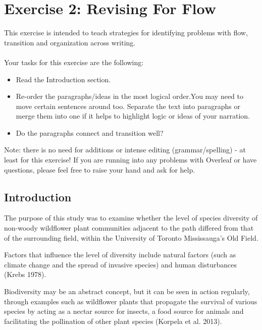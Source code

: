 \documentclass[11pt,a4paper]{article}
\begin{document}

\section{Exercise 2: Revising For Flow}

This exercise is intended to teach strategies for identifying problems with flow, transition and organization across writing.

\paragraph{} Your tasks for this exercise are the following:
\begin{itemize}
\item Read the Introduction section.
\item Re-order the paragraphs/ideas in the most logical order.You may need to move certain sentences around too. Separate the text into paragraphs or merge them into one if it helps to highlight logic or ideas of your narration.
\item Do the paragraphs connect and transition well?
\end{itemize}


Note: there is no need for additions or intense editing (grammar/spelling) - at least for this exercise! If you are running into any problems with Overleaf or have questions, please feel free to raise your hand and ask for help.

\subsection*{Introduction}

The purpose of this study was to examine whether the level of species diversity of non-woody wildflower plant communities adjacent to the path differed from that of the surrounding field, within the University of Toronto Mississauga’s Old Field. 

Factors that influence the level of diversity include natural factors (such as climate change and the spread of invasive species) and human disturbances (Krebs 1978). 

Biodiversity may be an abstract concept, but it can be seen in action regularly, through examples such as wildflower plants that propagate the survival of various species by acting as a nectar source for insects, a food source for animals and facilitating the pollination of other plant species (Korpela et al. 2013). 
\end{document}
